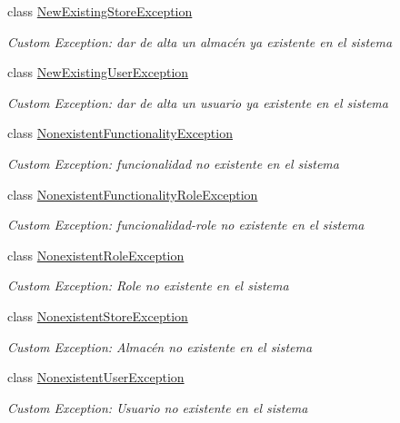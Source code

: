 \begin{DoxyCompactItemize}
class \mbox{\hyperlink{class_h_k_supply_1_1_exceptions_1_1_new_existing_store_exception}{New\+Existing\+Store\+Exception}}
\begin{DoxyCompactList}\small\item\em Custom Exception\+: dar de alta un almacén ya existente en el sistema \end{DoxyCompactList}\item 
class \mbox{\hyperlink{class_h_k_supply_1_1_exceptions_1_1_new_existing_user_exception}{New\+Existing\+User\+Exception}}
\begin{DoxyCompactList}\small\item\em Custom Exception\+: dar de alta un usuario ya existente en el sistema \end{DoxyCompactList}\item 
class \mbox{\hyperlink{class_h_k_supply_1_1_exceptions_1_1_nonexistent_functionality_exception}{Nonexistent\+Functionality\+Exception}}
\begin{DoxyCompactList}\small\item\em Custom Exception\+: funcionalidad no existente en el sistema \end{DoxyCompactList}\item 
class \mbox{\hyperlink{class_h_k_supply_1_1_exceptions_1_1_nonexistent_functionality_role_exception}{Nonexistent\+Functionality\+Role\+Exception}}
\begin{DoxyCompactList}\small\item\em Custom Exception\+: funcionalidad-\/role no existente en el sistema \end{DoxyCompactList}\item 
class \mbox{\hyperlink{class_h_k_supply_1_1_exceptions_1_1_nonexistent_role_exception}{Nonexistent\+Role\+Exception}}
\begin{DoxyCompactList}\small\item\em Custom Exception\+: Role no existente en el sistema \end{DoxyCompactList}\item 
class \mbox{\hyperlink{class_h_k_supply_1_1_exceptions_1_1_nonexistent_store_exception}{Nonexistent\+Store\+Exception}}
\begin{DoxyCompactList}\small\item\em Custom Exception\+: Almacén no existente en el sistema \end{DoxyCompactList}\item 
class \mbox{\hyperlink{class_h_k_supply_1_1_exceptions_1_1_nonexistent_user_exception}{Nonexistent\+User\+Exception}}
\begin{DoxyCompactList}\small\item\em Custom Exception\+: Usuario no existente en el sistema \end{DoxyCompactList}\end{DoxyCompactItemize}
